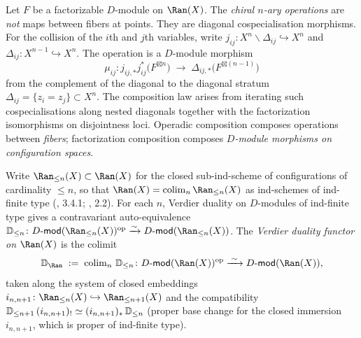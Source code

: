 \begin{definition}
\label{def:chiral-ops-fact}
Let $F$ be a factorizable $D$-module on $\Ran(X)$. The
\emph{chiral $n$-ary operations} are \emph{not} maps between
fibers at points. They are diagonal cospecialisation morphisms. For
the collision of the $i$th and $j$th variables, write
$j_{ij}\colon X^n\smallsetminus\Delta_{ij}\hookrightarrow X^n$ and
$\Delta_{ij}\colon X^{n-1}\hookrightarrow X^n$. The operation is a
$D$-module morphism
\begin{equation}\label{eq:chiral-op-diagonal}
 \mu_{ij}\colon
 j_{ij,*}j_{ij}^{*}\bigl(F^{\boxtimes n}\bigr)
 \;\longrightarrow\;
 \Delta_{ij,*}\bigl(F^{\boxtimes(n-1)}\bigr)
\end{equation}
from the complement of the diagonal to the diagonal stratum
$\Delta_{ij}=\{z_i=z_j\}\subset X^n$. The composition law arises from
iterating such cospecialisations along nested diagonals together with
the factorization isomorphisms on disjointness loci. Operadic
composition composes operations between \emph{fibers}; factorization
composition composes \emph{$D$-module morphisms on configuration
spaces}.
\end{definition}


\begin{definition}
\label{def:ran-verdier-duality}
Write $\Ran_{\leq n}(X) \subset \Ran(X)$ for the closed sub-ind-scheme of
configurations of cardinality $\leq n$, so that
$\Ran(X) = \colim_n \Ran_{\leq n}(X)$ as ind-schemes of ind-finite type
(\cite{BD04}, 3.4.1; \cite{FG11}, 2.2). For each $n$, Verdier duality
on $D$-modules of ind-finite type gives a contravariant auto-equivalence
$\bD_{\leq n}\colon \Dmod(\Ran_{\leq n}(X))^{\op}
\xrightarrow{\sim} \Dmod(\Ran_{\leq n}(X))$.
The \emph{Verdier duality functor on $\Ran(X)$} is the colimit
\begin{equation}\label{eq:ran-verdier}
 \bD_{\Ran}\;:=\;
 \colim_n\, \bD_{\leq n}
 \colon \Dmod(\Ran(X))^{\op}
 \xrightarrow{\;\sim\;}
 \Dmod(\Ran(X)),
\end{equation}
taken along the system of closed embeddings
$i_{n,n+1}\colon \Ran_{\leq n}(X) \hookrightarrow \Ran_{\leq n+1}(X)$
and the compatibility $\mathbb{D}_{\leq n+1}\,(i_{n,n+1})_{!} \simeq
(i_{n,n+1})_{\ast}\,\mathbb{D}_{\leq n}$ (proper base change for the closed
immersion $i_{n,n+1}$, which is proper of ind-finite type).
\end{definition}

